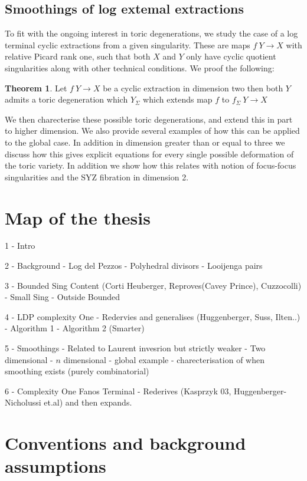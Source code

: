 \documentclass[11pt]{amsart}
\theoremstyle{definition}
\newtheorem{thm}{Theorem}[section]
\theoremstyle{definition}
\theoremstyle{definition}
\theoremstyle{definition}
\theoremstyle{definition}
\theoremstyle{definition}
\theoremstyle{definition}
\begin{document}
\subsection{Smoothings of log extemal extractions}

To fit with the ongoing interest in toric degenerations, we study the case of a log terminal cyclic extractions from a given singularity. These are maps $f \: Y \rightarrow X$ with relative Picard rank one, such that both $X$ and $Y$ only have cyclic quotient singularities along with other technical conditions. We proof the following:

\begin{thm}
Let  $f \: Y \rightarrow X$ be a cyclic extraction in dimension two then both $Y$ admits a toric degeneration which $Y_\Sigma$ which extends map $f$ to $f_\Sigma \: Y \rightarrow X$
\end{thm}
We then charecterise these possible toric degenerations, and extend this in part to higher dimension. We also provide several examples of how this can be applied to the global case. In addition in dimension greater than or equal to three we discuss how this gives explicit equations for every single possible deformation of the toric variety. In addition we show how this relates with notion of focus-focus singularities and the SYZ fibration in dimension 2.


\section{Map of the thesis}

1 - Intro

2 - Background
	- Log del Pezzos
	- Polyhedral divisors
	- Looijenga pairs

3 - Bounded Sing Content (Corti Heuberger, Reproves(Cavey Prince), Cuzzocolli)
	- Small Sing
	- Outside Bounded

4 - LDP complexity One - Redervies and generalises (Huggenberger,  Suss, Ilten..)
	- Algorithm 1 
	- Algorithm 2 (Smarter)

5 - Smoothings - Related to Laurent invesrion but strictly weaker
	- Two dimensional
	- $n$ dimensional
	- global example
	- charecterisation of when smoothing exists (purely combinatorial)

6 - Complexity One Fanos Terminal - Rederives (Kasprzyk 03, Huggenberger-Nicholussi et.al) and then expands.



\section{Conventions and background assumptions}
\end{document}
